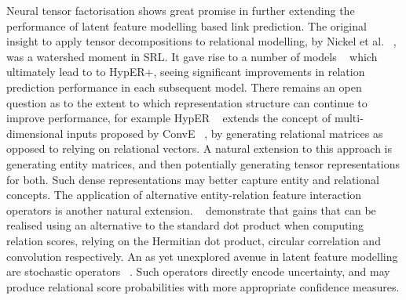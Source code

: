 \noindent Neural tensor factorisation shows great promise in further extending the performance of latent feature modelling based link prediction. The original insight to apply tensor decompositions to relational modelling, by Nickel et al. \unskip~\citep{nickel2011three}, was a watershed moment in SRL. It gave rise to a number of models \unskip~\citep{bordes2011learning, jenatton2012latent, socher2013reasoning, trouillon2016complex, hohenecker2017deep, dettmers2018convolutional, balazevic2019hypernetwork} which ultimately lead to to HypER+, seeing significant improvements in relation prediction performance in each subsequent model. There remains an open question as to the extent to which representation structure can continue to improve performance, for example HypER \unskip~\citep{balazevic2019hypernetwork} extends the concept of multi-dimensional inputs proposed by ConvE \unskip~\citep{dettmers2018convolutional}, by generating relational matrices as opposed to relying on relational vectors. A natural extension to this approach is generating entity matrices, and then potentially generating tensor representations for both. Such dense representations may better capture entity and relational concepts. The application of alternative entity-relation feature interaction operators is another natural extension. \unskip~\citep{trouillon2016complex, nickel2016holographic, dettmers2018convolutional} demonstrate that gains that can be realised using an alternative to the standard dot product when computing relation scores, relying on the Hermitian dot product, circular correlation and convolution respectively. An as yet unexplored avenue in latent feature modelling are stochastic operators \unskip~\citep{kingma2013auto}. Such operators directly encode uncertainty, and may produce relational score probabilities with more appropriate confidence measures. \par


